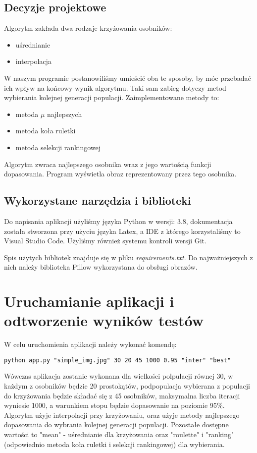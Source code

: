 \documentclass{article}
\begin{document}
\subsection{Decyzje projektowe}
Algorytm zakłada dwa rodzaje krzyżowania osobników:
\begin{itemize}
    \item uśrednianie
    \item interpolacja
\end{itemize}
W naszym programie postanowiliśmy umieścić oba te sposoby, by móc przebadać ich wpływ na końcowy wynik algorytmu.
Taki sam zabieg dotyczy metod wybierania kolejnej generacji populacji. Zaimplementowane metody to:
\begin{itemize}
    \item metoda $\mu$ najlepszych
    \item metoda koła ruletki
    \item metoda selekcji rankingowej
\end{itemize}
Algorytm zwraca najlepszego osobnika wraz z jego wartością funkcji dopasowania. Program wyświetla obraz reprezentowany przez tego osobnika.
\subsection{Wykorzystane narzędzia i biblioteki}
Do napisania aplikacji użyliśmy języka Python w wersji: 3.8, dokumentacja została stworzona przy użyciu języka Latex, a IDE z którego korzystaliśmy to Visual Studio Code. Użyliśmy również systemu kontroli wersji Git.

Spis użytych bibliotek znajduje się w pliku {\it requirements.txt}.
Do najważniejszych z nich należy biblioteka Pillow wykorzystana do obsługi obrazów.
\section{Uruchamianie aplikacji i odtworzenie wyników testów}
W celu uruchomienia aplikacji należy wykonać komendę:
\begin{verbatim}
python app.py "simple_img.jpg" 30 20 45 1000 0.95 "inter" "best"
\end{verbatim}
Wówczas aplikacja zostanie wykonana dla wielkości polpulacji równej 30, w każdym z osobników będzie 20 prostokątów, podpopulacja wybierana z populacji do krzyżowania będzie składać się z 45 osobników, maksymalna liczba iteracji wyniesie 1000, a warunkiem stopu będzie dopasowanie na poziomie 95\%.
Algorytm użyje interpolacji przy krzyżowaniu, oraz użyje metody najlepszego dopasowania do wybrania kolejnej generacji populacji. Pozostałe dostępne wartości to "mean" - uśrednianie dla krzyżowania oraz "roulette" i "ranking" (odpowiednio metoda koła ruletki i selekcji rankingowej) dla wybierania.
\end{document}
